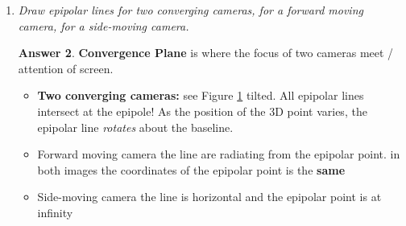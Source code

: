 \documentclass[a4paper,12 pt]{article}
\theoremstyle{definition}
\theoremstyle{remark}
\theoremstyle{definition}
\theoremstyle{definition}
\theoremstyle{definition}
\theoremstyle{definition}
\theoremstyle{remark}
\theoremstyle{remark}
\theoremstyle{definition}
\theoremstyle{definition}
\newtheorem*{answer}{Answer}
\begin{document}
\begin{enumerate}
\begin{enumerate}
\begin{answer}
\begin{figure}[h!]
\begin{center}
\caption{Epipolar lines and epipoles. \label{fig:epi}}
\end{center}
\end{figure}
\end{answer}
\item \textit{Draw epipolar lines for two converging cameras, for a forward moving camera, for a side-moving camera.} 
\begin{answer}
\textbf{Convergence Plane} is where the focus of two cameras meet / attention of screen.  
\begin{itemize}
\item \textbf{Two converging cameras:} see Figure \ref{fig:epi} tilted. All epipolar lines intersect at the epipole! As the position of the 3D point varies, the epipolar line \textit{rotates} about the baseline. 
\item  Forward moving camera the line are radiating from the epipolar point. in both images the coordinates of the epipolar point is the \textbf{same}
\item Side-moving camera the line is horizontal and the epipolar point is at infinity
\end{itemize}
\end{answer}
\end{enumerate}


\end{enumerate}
\end{document}
